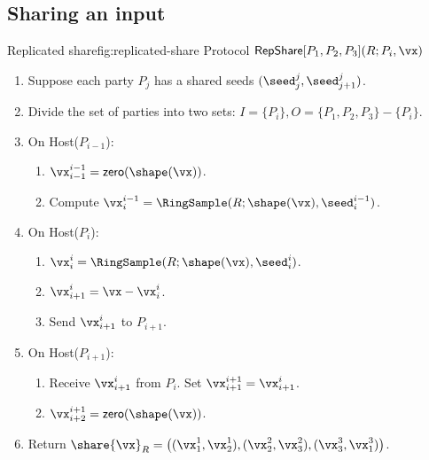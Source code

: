 \subsection{Sharing an input}


\begin{Boxfig}{Replicated share}{fig:replicated-share}
  {Protocol $\mathsf{RepShare}[P_1, P_2, P_3](R; P_i, \vx)$}
  
  \begin{enumerate}
  \item Suppose each party $P_j$ has a shared seeds $(\seed_j^j, \seed_{j+1}^j)$.
  \item Divide the set of parties into two sets: $I = \{P_i\}, O = \{P_1, P_2, P_3\} - \{P_i\}$.
  \item On Host($P_{i-1}$):
  \begin{enumerate}
    \item $\vx_{i-1}^{i-1} = \mathsf{zero}(\shape(\vx))$.
    \item Compute $\vx_i^{i-1} = \RingSample(R; \shape(\vx), \seed_i^{i-1})$.
  \end{enumerate}
  \item On Host($P_i$):
  \begin{enumerate}
    \item $\vx_i^i = \RingSample(R; \shape(\vx), \seed_{i}^i)$.
    \item $\vx_{i+1}^i = \vx - \vx_i^i$.
    \item Send $\vx_{i+1}^i$ to $P_{i+1}$.
  \end{enumerate}
  \item On Host($P_{i+1}$):
  \begin{enumerate}
    \item Receive $\vx_{i+1}^i$ from $P_i$. Set $\vx_{i+1}^{i+1} = \vx_{i+1}^i$.
    \item $\vx_{i+2}^{i+1} = \mathsf{zero}(\shape(\vx))$.
  \end{enumerate}
   \item Return $\share{\vx}_R = \left( (\vx_1^1, \vx_2^1), (\vx_2^2, \vx_3^2), (\vx_3^3, \vx_1^3) \right)$.
  \end{enumerate}
\end{Boxfig}

